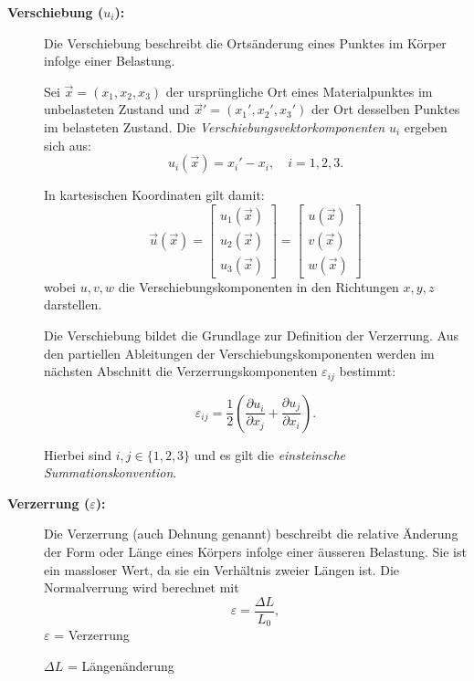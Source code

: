\begin{description}
\item[\textbf{Verschiebung ($u_i$):}] Die Verschiebung beschreibt die Ortsänderung eines Punktes im Körper infolge einer Belastung.

Sei $\vec{x} = (x_1, x_2, x_3)$ der ursprüngliche Ort eines Materialpunktes im unbelasteten Zustand und $\vec{x}' = (x_1', x_2', x_3')$ der Ort desselben Punktes im belasteten Zustand.  
Die \emph{Verschiebungsvektorkomponenten} $u_i$ ergeben sich aus:
\begin{equation*}
	u_i(\vec{x}) = x_i' - x_i,
	\quad i = 1,2,3.
\end{equation*}

In kartesischen Koordinaten gilt damit:
\[
\vec{u}(\vec{x}) =
\begin{bmatrix}
	u_1(\vec{x}) \\
	u_2(\vec{x}) \\
	u_3(\vec{x})
\end{bmatrix}
=
\begin{bmatrix}
	u(\vec{x}) \\
	v(\vec{x}) \\
	w(\vec{x})
\end{bmatrix}
\]
wobei $u, v, w$ die Verschiebungskomponenten in den Richtungen $x, y, z$ darstellen.

Die Verschiebung bildet die Grundlage zur Definition der Verzerrung. 
Aus den partiellen Ableitungen der Verschiebungskomponenten werden im nächsten Abschnitt die Verzerrungskomponenten $\varepsilon_{ij}$ bestimmt:

\begin{equation*}
	\varepsilon_{ij} = \frac{1}{2}
	\left(
	\frac{\partial u_i}{\partial x_j}
	+
	\frac{\partial u_j}{\partial x_i}
	\right).
\end{equation*}

Hierbei sind $i,j \in \{1,2,3\}$ und es gilt die \emph{einsteinsche Summationskonvention}.

\item[\textbf{Verzerrung ($\varepsilon$):}] Die Verzerrung (auch Dehnung genannt) beschreibt die relative Änderung der Form oder Länge eines Körpers infolge einer äusseren Belastung. 
Sie ist ein massloser Wert, da sie ein Verhältnis zweier Längen ist.
Die Normalverrung wird berechnet mit
	\begin{equation*}
		\varepsilon 
		= \frac{\Delta L}{L_0},
	\end{equation*}
	$\varepsilon$ = Verzerrung
	
	$\Delta L$ = Längenänderung
	

\end{description}
